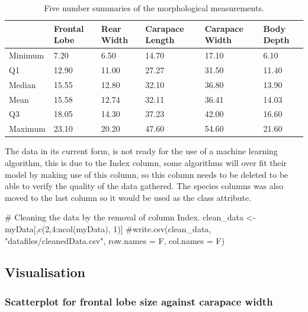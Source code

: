 \documentclass[
]{article}
\newenvironment{Shaded}{}{}
\newcommand{\CommentTok}[1]{\textcolor[rgb]{0.00,0.50,0.00}{#1}}
\newcommand{\DecValTok}[1]{#1}
\newcommand{\FunctionTok}[1]{#1}
\newcommand{\NormalTok}[1]{#1}
\newcommand{\OtherTok}[1]{\textcolor[rgb]{1.00,0.25,0.00}{#1}}
\newcommand{\SpecialCharTok}[1]{\textcolor[rgb]{0.00,0.50,0.50}{#1}}
\begin{document}
\begin{table}[!h]

\caption{\label{tab:summary}Five number summaries of the morphological measurements.}
\centering
\begin{tabular}[t]{l|l|l|l|l|l}
\hline
  & Frontal Lobe & Rear Width & Carapace Length & Carapace Width & Body Depth\\
\hline
Minimum & 7.20 & 6.50 & 14.70 & 17.10 & 6.10\\
\hline
Q1 & 12.90 & 11.00 & 27.27 & 31.50 & 11.40\\
\hline
Median & 15.55 & 12.80 & 32.10 & 36.80 & 13.90\\
\hline
Mean & 15.58 & 12.74 & 32.11 & 36.41 & 14.03\\
\hline
Q3 & 18.05 & 14.30 & 37.23 & 42.00 & 16.60\\
\hline
Maximum & 23.10 & 20.20 & 47.60 & 54.60 & 21.60\\
\hline
\end{tabular}
\end{table}

The data in its current form, is not ready for the use of a machine
learning algorithm, this is due to the Index column, some algorithms
will over fit their model by making use of this column, so this column
needs to be deleted to be able to verify the quality of the data
gathered. The species columns was also moved to the last column so it
would be used as the class attribute.

\begin{Shaded}
\begin{Highlighting}[]
\CommentTok{\# Cleaning the data by the removal of column Index.}
\NormalTok{clean\_data }\OtherTok{\textless{}{-}}\NormalTok{ myData[,}\FunctionTok{c}\NormalTok{(}\DecValTok{2}\NormalTok{,}\DecValTok{4}\SpecialCharTok{:}\FunctionTok{ncol}\NormalTok{(myData), }\DecValTok{1}\NormalTok{)]}
\CommentTok{\#write.csv(clean\_data, "datafiles/cleanedData.csv", row.names = F, col.names = F)}
\end{Highlighting}
\end{Shaded}

\newpage

\hypertarget{visualisation}{%
\subsection{Visualisation}\label{visualisation}}

\hypertarget{scatterplot-for-frontal-lobe-size-against-carapace-width}{%
\subsubsection{Scatterplot for frontal lobe size against carapace
width}\label{scatterplot-for-frontal-lobe-size-against-carapace-width}}
\end{document}
